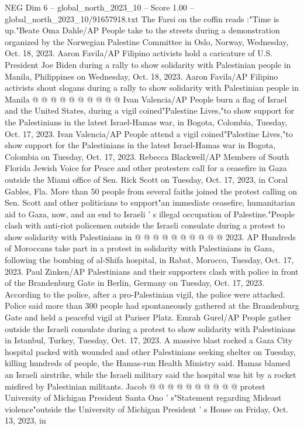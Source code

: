 \begin{textsample}{NEG Dim 6 – global\_north\_2023\_10 – Score 1.00 – global\_north\_2023\_10/91657918.txt}
The Farsi on the coffin reads :"Time is up."Beate Oma Dahle/AP People take to the streets during a demonstration organized by the Norwegian Palestine Committee in Oslo, Norway, Wednesday, Oct. 18, 2023.
Aaron Favila/AP Filipino activists hold a caricature of U.S.
President Joe Biden during a rally to show solidarity with Palestinian people in Manila, Philippines on Wednesday, Oct. 18, 2023.
Aaron Favila/AP Filipino activists shout slogans during a rally to show solidarity with Palestinian people in Manila @ @ @ @ @ @ @ @ @ @ Ivan Valencia/AP People burn a flag of Israel and the United States, during a vigil coined"Palestine Lives,"to show support for the Palestinians in the latest Israel-Hamas war, in Bogota, Colombia, Tuesday, Oct. 17, 2023.
Ivan Valencia/AP People attend a vigil coined"Palestine Lives,"to show support for the Palestinians in the latest Israel-Hamas war in Bogota, Colombia on Tuesday, Oct. 17, 2023.
Rebecca Blackwell/AP Members of South Florida Jewish Voice for Peace and other protesters call for a ceasefire in Gaza outside the Miami office of Sen.
Rick Scott on Tuesday, Oct. 17, 2023, in Coral Gables, Fla.
More than 50 people from several faiths joined the protest calling on Sen.
Scott and other politicians to support"an immediate ceasefire, humanitarian aid to Gaza, now, and an end to Israeli ' s illegal occupation of Palestine."People clash with anti-riot policemen outside the Israeli consulate during a protest to show solidarity with Palestinians in @ @ @ @ @ @ @ @ @ @ 2023.
AP Hundreds of Moroccans take part in a protest in solidarity with Palestinians in Gaza, following the bombing of al-Shifa hospital, in Rabat, Morocco, Tuesday, Oct. 17, 2023.
Paul Zinken/AP Palestinians and their supporters clash with police in front of the Brandenburg Gate in Berlin, Germany on Tuesday, Oct. 17, 2023.
According to the police, after a pro-Palestinian vigil, the police were attacked.
Police said more than 300 people had spontaneously gathered at the Brandenburg Gate and held a peaceful vigil at Pariser Platz.
Emrah Gurel/AP People gather outside the Israeli consulate during a protest to show solidarity with Palestinians in Istanbul, Turkey, Tuesday, Oct. 17, 2023.
A massive blast rocked a Gaza City hospital packed with wounded and other Palestinians seeking shelter on Tuesday, killing hundreds of people, the Hamas-run Health Ministry said.
Hamas blamed an Israeli airstrike, while the Israeli military said the hospital was hit by a rocket misfired by Palestinian militants.
Jacob @ @ @ @ @ @ @ @ @ @ protest University of Michigan President Santa Ono ' s"Statement regarding Mideast violence"outside the University of Michigan President ' s House on Friday, Oct. 13, 2023, in

\end{textsample}
